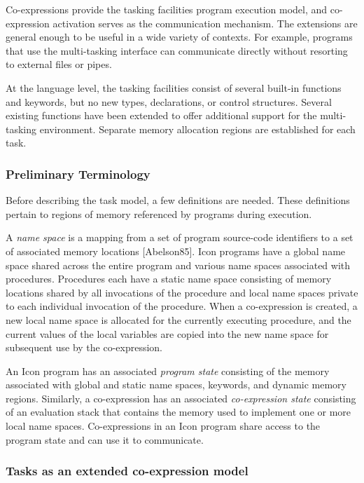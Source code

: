 Co-expressions provide the tasking facilities{\textquotesingle} program
execution model, and co-expression activation serves as the
communication mechanism. The extensions are general enough to be useful
in a wide variety of contexts. For example, programs that use the
multi-tasking interface can communicate directly without resorting to
external files or pipes.

At the language level, the tasking facilities consist of several
built-in functions and keywords, but no new types, declarations, or
control structures. Several existing functions have been extended to
offer additional support for the multi-tasking environment. 
Separate memory allocation regions are established for each task. 

\subsubsection[Preliminary Terminology]{Preliminary Terminology}

Before describing the task model, a few definitions are needed. These
definitions pertain to regions of memory referenced by programs during
execution. 

A \textit{name space} is a mapping from a set of program source-code
identifiers to a set of associated memory locations [Abelson85]. Icon
programs have a global name space shared across the entire program and
various name spaces associated with procedures. Procedures each have a
static name space consisting of memory locations shared by all
invocations of the procedure and local name spaces private to each
individual invocation of the procedure.
When a co-expression is created, a new local name space is allocated for
the currently executing procedure, and the current values of the local
variables are copied into the new name space for subsequent use by the
co-expression. 

An Icon program has an associated \textit{program state} consisting of
the memory associated with global and static name spaces, keywords, and
dynamic memory regions. Similarly, a co-expression has an associated
\textit{co-expression state} consisting of an evaluation stack that
contains the memory used to implement one or more local name spaces.
Co-expressions in an Icon program share access to the program state and
can use it to communicate. 

\subsubsection{Tasks as an extended co-expression model}

